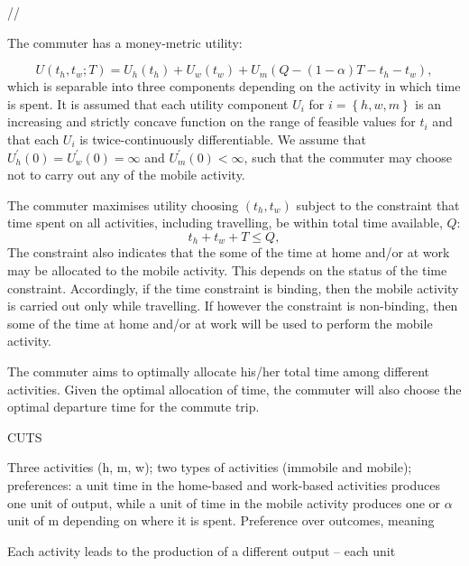 \documentclass[12pt,a4paper,british]{article}
\theoremstyle{definition}
\theoremstyle{plain}
\theoremstyle{plain}
\begin{document}
//

The commuter has a money-metric utility: %

{} 
\begin{equation}
U\left(t_{h},t_{w};T\right)=U_{h}\left(t_{h}\right)+U_{w}\left(t_{w}\right)+U_{m}\left(Q-\left(1-\alpha\right)T-t_{h}-t_{w}\right),\label{utility}
\end{equation}
which is separable into three components depending on the activity in which time is spent. It is assumed that each utility component $U_{i}$ for $i=\left\{ h,w,m\right\} $ is an increasing and strictly concave function on the range of feasible values for $t_{i}$ and that each $U_{i}$ is twice-continuously differentiable. We assume that $U_{h}^{\prime}\left(0\right) = U_{w}^{\prime}\left(0\right) = \infty$ and $U_{m}^{\prime}\left(0\right)<\infty$, such that the commuter may choose not to carry out any of the mobile activity.

The commuter maximises utility choosing $\left(t_{h},t_{w}\right)$ subject to the constraint that time spent on all activities, including travelling, be within total time available, $Q$:  
\begin{equation}
t_{h}+t_{w}+T\leq Q,\label{constraint}
\end{equation}
The constraint also indicates that the some of the time at home and/or at work may be allocated to the mobile activity. This depends on the status of the time constraint. Accordingly, if the time constraint is binding, then the mobile activity is carried out only while travelling. If however the constraint is non-binding, then some of the time at home and/or at work will be used to perform the mobile activity. 

The commuter aims to optimally allocate his/her total time among different activities. Given the optimal allocation of time, the commuter will also choose the optimal departure time for the commute trip.

CUTS

Three activities (h, m, w); two types of activities (immobile and mobile); preferences: a unit time in the home-based and work-based activities produces one unit of output, while a unit of time in the mobile activity produces one or $\alpha$ unit of m depending on where it is spent. Preference over outcomes, meaning

Each activity leads to the production of a different output -- each unit 
\end{document}
